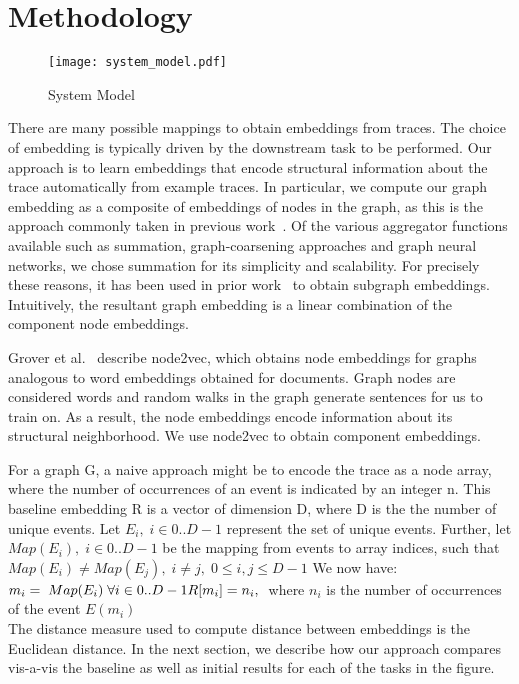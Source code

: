 \section{Methodology}
\begin{figure}[h]
\begin{center}
\texttt{[image: system\_model.pdf]}
\caption{System Model} 
\label{System_model}
\end{center}
\end{figure}

There are many possible mappings to obtain embeddings from traces. The choice of embedding is typically driven by the downstream task to be performed. Our approach is to learn embeddings that encode structural information about the trace automatically from example traces. In particular, we compute our graph embedding as a composite of embeddings of nodes in the graph, as this is the approach commonly taken in previous work~\cite{corr_2017_abs-1709-05584}. Of the various aggregator functions available such as summation, graph-coarsening approaches and graph neural networks, we chose summation for its simplicity and scalability. For precisely these reasons, it has been used in prior work~\cite{DBLP:journals/corr/DuvenaudMAGHAA15, DBLP:journals/corr/DaiDS16} to obtain subgraph embeddings. Intuitively, the resultant graph embedding is a linear combination of the component node embeddings. 

Grover et al.~\cite{corr18_GroverL16} describe node2vec, which obtains node embeddings for graphs analogous to word embeddings obtained for documents. Graph nodes are considered words and random walks in the graph generate sentences for us to train on. As a result, the node embeddings encode information about its structural neighborhood. We use node2vec to obtain component embeddings.  

For a graph G, a naive approach might be to encode the trace as a node array, where the number of occurrences of an event is indicated by an integer n. This baseline embedding R is a vector of dimension D, where D is the the number of unique events. 
Let $E_{i},\; i \in {0..D-1} $ represent the set of unique events. Further, let $Map(E_{i}),\; i \in {0..D-1} $ be the mapping from events to array indices, such that $ Map(E_{i}) \neq Map(E_{j}),\;  i \neq j,\; 0 \leq i,j \leq D-1 $ We now have: \newline
\begin{math}
m_{i} =\; Map(E_{i})\; \forall i \in {0..D-1} \\
R[m_{i}] = n_{i},\;  
\end{math}
where $n_{i}$ is the number of occurrences of the event $ E(m_{i})$\\

The distance measure used to compute distance between embeddings is the Euclidean distance. In the next section, we describe how our approach compares vis-a-vis the baseline as well as initial results for each of the tasks in the figure.